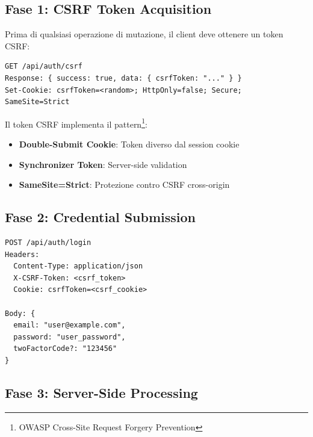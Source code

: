 \documentclass[12pt,a4paper]{report}
\begin{document}
\subsection{Fase 1: CSRF Token Acquisition}

Prima di qualsiasi operazione di mutazione, il client deve ottenere un token CSRF:

\begin{lstlisting}[caption={Endpoint CSRF}, label={lst:csrf}]
GET /api/auth/csrf
Response: { success: true, data: { csrfToken: "..." } }
Set-Cookie: csrfToken=<random>; HttpOnly=false; Secure; SameSite=Strict
\end{lstlisting}

Il token CSRF implementa il pattern\footnote{OWASP Cross-Site Request Forgery Prevention}:
\begin{itemize}
    \item \textbf{Double-Submit Cookie}: Token diverso dal session cookie
    \item \textbf{Synchronizer Token}: Server-side validation
    \item \textbf{SameSite=Strict}: Protezione contro CSRF cross-origin
\end{itemize}

\subsection{Fase 2: Credential Submission}

\begin{lstlisting}[caption={Login Request}, label={lst:login}]
POST /api/auth/login
Headers:
  Content-Type: application/json
  X-CSRF-Token: <csrf_token>
  Cookie: csrfToken=<csrf_cookie>

Body: {
  email: "user@example.com",
  password: "user_password",
  twoFactorCode?: "123456"
}
\end{lstlisting}

\subsection{Fase 3: Server-Side Processing}
\end{document}
